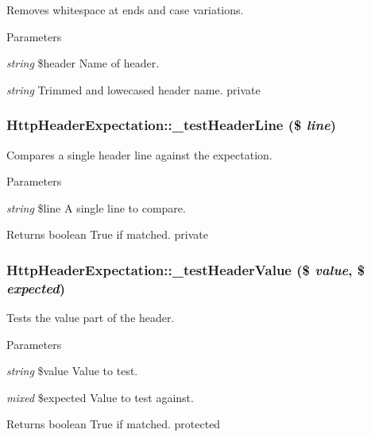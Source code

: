 \label{class_http_header_expectation_a45f30ccc9cec011cd55f3bed48f45807}
Removes whitespace at ends and case variations. 
\begin{DoxyParams}{Parameters}
\item[{\em string}]\$header Name of header. \item[{\em string}]Trimmed and lowecased header name.  private \end{DoxyParams}
\hypertarget{class_http_header_expectation_a088544f94d409d28df142ff0ca5dd146}{
\subsubsection[{\_\-testHeaderLine}]{\setlength{\rightskip}{0pt plus 5cm}HttpHeaderExpectation::\_\-testHeaderLine (\$ {\em line})}}
\label{class_http_header_expectation_a088544f94d409d28df142ff0ca5dd146}
Compares a single header line against the expectation. 
\begin{DoxyParams}{Parameters}
\item[{\em string}]\$line A single line to compare. \end{DoxyParams}
\begin{DoxyReturn}{Returns}
boolean True if matched.  private 
\end{DoxyReturn}
\hypertarget{class_http_header_expectation_a53fd1ae122651ea92db15820cf588329}{
\subsubsection[{\_\-testHeaderValue}]{\setlength{\rightskip}{0pt plus 5cm}HttpHeaderExpectation::\_\-testHeaderValue (\$ {\em value}, \/  \$ {\em expected})}}
\label{class_http_header_expectation_a53fd1ae122651ea92db15820cf588329}
Tests the value part of the header. 
\begin{DoxyParams}{Parameters}
\item[{\em string}]\$value Value to test. \item[{\em mixed}]\$expected Value to test against. \end{DoxyParams}
\begin{DoxyReturn}{Returns}
boolean True if matched.  protected 
\end{DoxyReturn}
